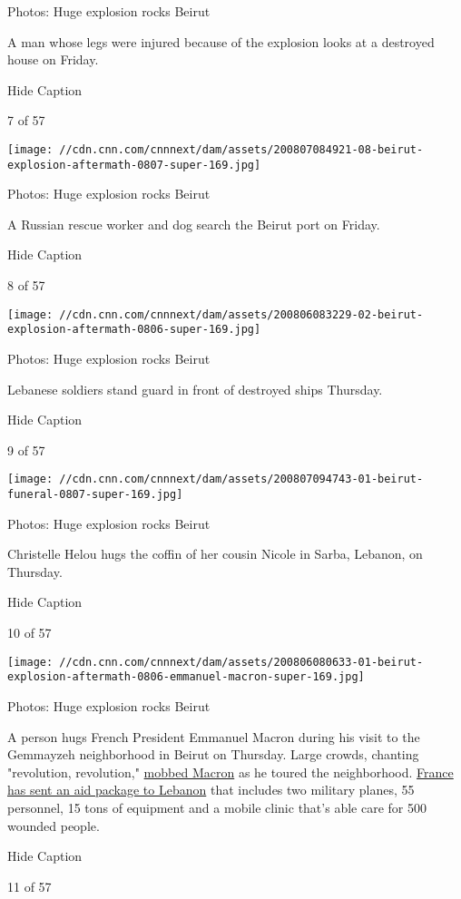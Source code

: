 Photos: Huge explosion rocks Beirut

A man whose legs were injured because of the explosion looks at a
destroyed house on Friday.

Hide Caption

7 of 57

\texttt{[image: //cdn.cnn.com/cnnnext/dam/assets/200807084921-08-beirut-explosion-aftermath-0807-super-169.jpg]}

Photos: Huge explosion rocks Beirut

A Russian rescue worker and dog search the Beirut port on Friday.

Hide Caption

8 of 57

\texttt{[image: //cdn.cnn.com/cnnnext/dam/assets/200806083229-02-beirut-explosion-aftermath-0806-super-169.jpg]}

Photos: Huge explosion rocks Beirut

Lebanese soldiers stand guard in front of destroyed ships Thursday.

Hide Caption

9 of 57

\texttt{[image: //cdn.cnn.com/cnnnext/dam/assets/200807094743-01-beirut-funeral-0807-super-169.jpg]}

Photos: Huge explosion rocks Beirut

Christelle Helou hugs the coffin of her cousin Nicole in Sarba, Lebanon,
on Thursday.

Hide Caption

10 of 57

\texttt{[image: //cdn.cnn.com/cnnnext/dam/assets/200806080633-01-beirut-explosion-aftermath-0806-emmanuel-macron-super-169.jpg]}

Photos: Huge explosion rocks Beirut

A person hugs French President Emmanuel Macron during his visit to the
Gemmayzeh neighborhood in Beirut on Thursday. Large crowds, chanting
"revolution, revolution,"
\href{https://www.cnn.com/2020/08/06/middleeast/beirut-explosion-anger-intl-hnk/index.html}{mobbed
Macron} as he toured the neighborhood.
\href{https://www.cnn.com/middleeast/live-news/beirut-lebanon-explosion-08-06-2020/h_8e4d94733d3dd5c37c7d0cc1c364fb8c}{France
has sent an aid package to Lebanon} that includes two military planes,
55 personnel, 15 tons of equipment and a mobile clinic that's able care
for 500 wounded people.

Hide Caption

11 of 57

